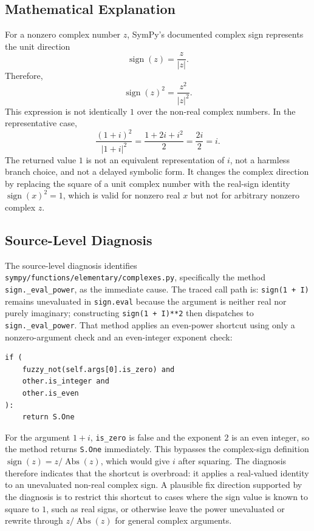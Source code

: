 \documentclass[11pt]{article}
\begin{document}
\subsection{Mathematical Explanation}

For a nonzero complex number \(z\), SymPy's documented complex sign represents the unit direction
\[
  \operatorname{sign}(z) = \frac{z}{|z|}.
\]
Therefore,
\[
  \operatorname{sign}(z)^2 = \frac{z^2}{|z|^2}.
\]
This expression is not identically \(1\) over the non-real complex numbers. In the representative case,
\[
  \frac{(1+i)^2}{|1+i|^2}
  = \frac{1 + 2i + i^2}{2}
  = \frac{2i}{2}
  = i.
\]
The returned value \(1\) is not an equivalent representation of \(i\), not a harmless branch choice, and not a delayed symbolic form. It changes the complex direction by replacing the square of a unit complex number with the real-sign identity \(\operatorname{sign}(x)^2 = 1\), which is valid for nonzero real \(x\) but not for arbitrary nonzero complex \(z\).

\subsection{Source-Level Diagnosis}

The source-level diagnosis identifies \nolinkurl{sympy/functions/elementary/complexes.py}, specifically the method \texttt{sign.\_eval\_power}, as the immediate cause. The traced call path is: \texttt{sign(1 + I)} remains unevaluated in \texttt{sign.eval} because the argument is neither real nor purely imaginary; constructing \texttt{sign(1 + I)**2} then dispatches to \texttt{sign.\_eval\_power}. That method applies an even-power shortcut using only a nonzero-argument check and an even-integer exponent check:

\begin{lstlisting}[style=bugpython]
if (
    fuzzy_not(self.args[0].is_zero) and
    other.is_integer and
    other.is_even
):
    return S.One
\end{lstlisting}

For the argument \(1+i\), \texttt{is\_zero} is false and the exponent \(2\) is an even integer, so the method returns \texttt{S.One} immediately. This bypasses the complex-sign definition \(\operatorname{sign}(z)=z/\operatorname{Abs}(z)\), which would give \(i\) after squaring. The diagnosis therefore indicates that the shortcut is overbroad: it applies a real-valued identity to an unevaluated non-real complex sign. A plausible fix direction supported by the diagnosis is to restrict this shortcut to cases where the sign value is known to square to \(1\), such as real signs, or otherwise leave the power unevaluated or rewrite through \(z/\operatorname{Abs}(z)\) for general complex arguments.
\end{document}
